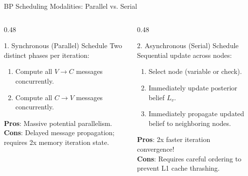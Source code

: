 \begin{frame}{BP Scheduling Modalities: Parallel vs. Serial}
    \begin{columns}[T]
        \begin{column}{0.48\textwidth}
            \begin{block}{1. Synchronous (Parallel) Schedule}
                Two distinct phases per iteration:
                \begin{enumerate}
                    \item Compute all $V \rightarrow C$ messages concurrently.
                    \item Compute all $C \rightarrow V$ messages concurrently.
                \end{enumerate}
                \textbf{Pros}: Massive potential parallelism.\\
                \textbf{Cons}: Delayed message propagation; requires 2x memory iteration state.
            \end{block}
        \end{column}
        
        \begin{column}{0.48\textwidth}
            \begin{block}{2. Asynchronous (Serial) Schedule}
                Sequential update across nodes:
                \begin{enumerate}
                    \item Select node (variable or check).
                    \item Immediately update posterior belief $L_v$.
                    \item Immediately propagate updated belief to neighboring nodes.
                \end{enumerate}
                \textbf{Pros}: 2x faster iteration convergence!\\
                \textbf{Cons}: Requires careful ordering to prevent L1 cache thrashing.
            \end{block}
        \end{column}
    \end{columns}
\end{frame}


